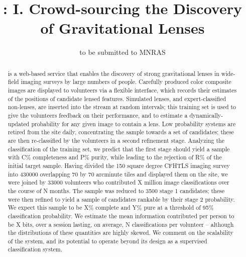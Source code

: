 \documentclass[useAMS,usenatbib,a4paper]{mn2e}
\title[\sw I]
{\SW: I. Crowd-sourcing the Discovery of Gravitational Lenses}
\author[Marshall et al.]{%
  
}
\begin{document}
             
\date{to be submitted to MNRAS}
\pagerange{\pageref{firstpage}--\pageref{lastpage}}

\maketitle           

\label{firstpage}


\begin{abstract} 

\sw is a web-based service that enables the discovery of strong gravitational
lenses in wide-field imaging surveys by large numbers of people. Carefully
produced color composite images are displayed to volunteers via a flexible
interface, which records their estimates of the positions of candidate lensed
features. Simulated lenses, and expert-classified non-lenses, are inserted
into the stream at random intervals; this training set is used to give the
volunteers feedback on their performance, and to estimate a
dynamically-updated probability for any given image to contain a lens. Low
probability systems are retired from the site daily, concentrating the sample
towards a set of candidates; these are then re-classified by the volunteers in
a second  refinement stage. Analyzing the classification of the training set,
we predict that the first stage should yield a sample with C\% completeness
and P\% purity, while leading to the rejection of R\% of the initial target
sample. Having divided the 150 square degree CFHTLS imaging survey into 430000
overlapping 70 by 70 arcminute tiles and displayed them on the site, we were
joined by 33000 volunteers who contributed X million image classifications
over the course of N months. The sample was reduced to 3500 stage 1
candidates; these were then refined to yield a sample of candidates rankable
by their stage 2 probability. We expect this sample to be X\% complete and Y\%
pure at a threshold of 95\% classification probability. We estimate the mean
information contributed per person to be X bits, over a session lasting, on
average, N classifications per volunteer -- although the distributions of
these quantities are highly skewed. We comment on the scalability of the \sw
system, and its potential to operate beyond its design as a supervised
classification system. 

\end{abstract}
\end{document}
